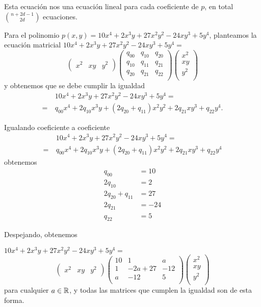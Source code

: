 Esta ecuación nos una ecuación lineal para cada coeficiente de $p$, en total $\binom{n+2d-1}{2d}$ ecuaciones.

\begin{example}
Para el polinomio $p(x,y) = 10x^4+2x^3y+27x^2y^2-24xy^3+5y^4$, planteamos la ecuación matricial
$10x^4+2x^3y+27x^2y^2-24xy^3+5y^4 = $
\[
\begin{pmatrix}
x^2 & xy & y^2
\end{pmatrix}
\begin{pmatrix}
q_{00} & q_{10} & q_{20} \\
q_{10} & q_{11} & q_{21} \\
q_{20} & q_{21} & q_{22} \\
\end{pmatrix}
\begin{pmatrix}
x^2 \\
xy \\
y^2 \\
\end{pmatrix}
\]
y obtenemos que se debe cumplir la igualdad
\begin{align*}
& 10x^4+2x^3y+27x^2y^2-24xy^3+5y^4 = \\
= \  & q_{00} x^4 + 2q_{10} x^3y + (2q_{20} + q_{11})x^2y^2 + 2q_{21}xy^3 + q_{22} y^4.
\end{align*}


Igualando coeficiente a coeficiente
\begin{align*}
& 10x^4+2x^3y+27x^2y^2-24xy^3+5y^4 = \\
= \  & q_{00} x^4 + 2q_{10} x^3y + (2q_{20} + q_{11})x^2y^2 + 2q_{21}xy^3 + q_{22} y^4
\end{align*}
obtenemos
\begin{align*}
q_{00} &= 10 \\
2q_{10} &= 2 \\
2q_{20} + q_{11} &= 27 \\
2q_{21} &= -24 \\
q_{22} &= 5
\end{align*}

Despejando, obtenemos

$10x^4+2x^3y+27x^2y^2-24xy^3+5y^4 = $
\[
\begin{pmatrix}
x^2 & xy & y^2
\end{pmatrix}
\begin{pmatrix}
10 & 1 & a \\
1 & -2a + 27 & -12 \\
a & -12 & 5 \\
\end{pmatrix}
\begin{pmatrix}
x^2 \\
xy \\
y^2 \\
\end{pmatrix}
\]
para cualquier $a \in \mathbb{R}$, y todas las matrices que cumplen la igualdad son de esta forma.



\end{example}
